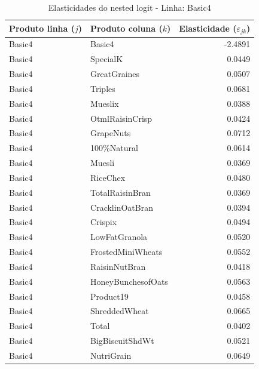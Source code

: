 


\begingroup
\begin{table}[H]
\centering
\caption{Elasticidades do nested logit - Linha: Basic4}
\label{tab:elasticity-nested-logit-global}
\label{tab:elas-nested-basic4}
\small
\begin{tabular}{llr}
\toprule
Produto linha ($j$) & Produto coluna ($k$) & Elasticidade ($\varepsilon_{jk}$) \\
\midrule
Basic4 & Basic4 & -2.4891 \\
Basic4 & SpecialK & 0.0449 \\
Basic4 & GreatGraines & 0.0507 \\
Basic4 & Triples & 0.0681 \\
Basic4 & Mueslix & 0.0388 \\
Basic4 & OtmlRaisinCrisp & 0.0424 \\
Basic4 & GrapeNuts & 0.0712 \\
Basic4 & 100\%Natural & 0.0614 \\
Basic4 & Muesli & 0.0369 \\
Basic4 & RiceChex & 0.0480 \\
Basic4 & TotalRaisinBran & 0.0369 \\
Basic4 & CracklinOatBran & 0.0394 \\
Basic4 & Crispix & 0.0494 \\
Basic4 & LowFatGranola & 0.0520 \\
Basic4 & FrostedMiniWheats & 0.0552 \\
Basic4 & RaisinNutBran & 0.0418 \\
Basic4 & HoneyBunchesofOats & 0.0563 \\
Basic4 & Product19 & 0.0458 \\
Basic4 & ShreddedWheat & 0.0665 \\
Basic4 & Total & 0.0402 \\
Basic4 & BigBiscuitShdWt & 0.0521 \\
Basic4 & NutriGrain & 0.0649 \\

\end{tabular}
\end{table}

